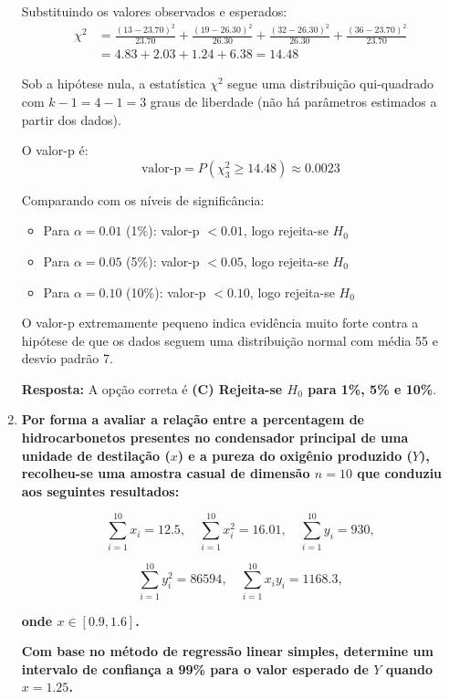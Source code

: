 \documentclass[a4paper,12pt]{article}
\begin{document}
\begin{enumerate}
\begin{mdframed}[backgroundcolor=gray!10,linewidth=0pt,innertopmargin=10pt,innerbottommargin=10pt]
    Substituindo os valores observados e esperados:
    \begin{align*}
    \chi^2 &= \frac{(13-23.70)^2}{23.70} + \frac{(19-26.30)^2}{26.30} + \frac{(32-26.30)^2}{26.30} + \frac{(36-23.70)^2}{23.70} \\
    &= 4.83 + 2.03 + 1.24 + 6.38 = 14.48
    \end{align*}

    Sob a hipótese nula, a estatística $\chi^2$ segue uma distribuição qui-quadrado com $k-1 = 4-1 = 3$ graus de liberdade (não há parâmetros estimados a partir dos dados).

    O valor-p é:
    \[
    \text{valor-p} = P(\chi^2_3 \geq 14.48) \approx 0.0023
    \]

    Comparando com os níveis de significância:
    \begin{itemize}
        \item Para $\alpha = 0.01$ (1\%): valor-p $< 0.01$, logo rejeita-se $H_0$
        \item Para $\alpha = 0.05$ (5\%): valor-p $< 0.05$, logo rejeita-se $H_0$
        \item Para $\alpha = 0.10$ (10\%): valor-p $< 0.10$, logo rejeita-se $H_0$
    \end{itemize}

    O valor-p extremamente pequeno indica evidência muito forte contra a hipótese de que os dados seguem uma distribuição normal com média 55 e desvio padrão 7.

    \textbf{Resposta:} A opção correta é \textbf{(C) Rejeita-se $H_0$ para 1\%, 5\% e 10\%}.
    \end{mdframed}

    \vspace{0.5cm}
    
    \item \textbf{Por forma a avaliar a relação entre a percentagem de hidrocarbonetos presentes no condensador principal de uma unidade de destilação (\(x\)) e a pureza do oxigênio produzido (\(Y\)), recolheu-se uma amostra casual de dimensão \(n = 10\) que conduziu aos seguintes resultados:}

    \[
    \sum_{i=1}^{10} x_i = 12.5,\quad 
    \sum_{i=1}^{10} x_i^2 = 16.01,\quad 
    \sum_{i=1}^{10} y_i = 930,
    \]

    \[
    \sum_{i=1}^{10} y_i^2 = 86594,\quad 
    \sum_{i=1}^{10} x_i y_i = 1168.3,
    \]
    
    \textbf{onde \(x \in [0.9,1.6]\).}

    \textbf{Com base no método de regressão linear simples, determine um intervalo de confiança a 99\% para o valor esperado de \(Y\) quando \(x = 1.25\).}


\end{enumerate}
\end{document}
